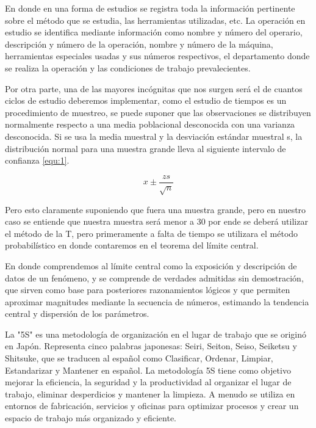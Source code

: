     
    En donde en una forma de estudios se registra toda la información pertinente sobre el método que se estudia, las herramientas utilizadas, etc. La operación en estudio se identifica mediante información como nombre y número del operario, descripción y número de la operación, nombre y número de la máquina, herramientas especiales usadas y sus números respectivos, el departamento donde se realiza la operación y las condiciones de trabajo prevalecientes. 
    \cite{niebel1980ingenieria}
    
    Por otra parte, una de las mayores incógnitas que nos surgen será el de cuantos ciclos de estudio deberemos implementar, como el estudio de tiempos es un procedimiento de muestreo, se puede suponer que las observaciones se distribuyen normalmente respecto a una media poblacional desconocida con una varianza desconocida. Si se usa la media muestral y la desviación estándar muestral s, la distribución normal para una muestra grande lleva al siguiente intervalo de confianza \ref{equ:1}. 
    
    \begin{equation}
        \label{equ:1}
        x {\pm} {\frac{zs}{\sqrt{n}}}
    \end{equation}
    
    Pero esto claramente suponiendo que fuera una muestra grande, pero en nuestro caso se entiende que nuestra muestra será menor a 30 por ende se deberá utilizar el método de la T, pero primeramente a falta de tiempo se utilizara el método probabilístico en donde contaremos en el teorema del límite central.
    
    En donde comprendemos al límite central como la exposición y descripción de datos de un fenómeno, y se comprende de verdades admitidas sin demostración, que sirven como base para posteriores razonamientos lógicos y que permiten aproximar magnitudes mediante la secuencia de números, estimando la tendencia central y dispersión de los parámetros. \cite{RAE}
    
    
    
     La "5S" es una metodología de organización en el lugar de trabajo que se originó en Japón. Representa cinco palabras japonesas: Seiri, Seiton, Seiso, Seiketsu y Shitsuke, que se traducen al español como Clasificar, Ordenar, Limpiar, Estandarizar y Mantener en español. La metodología 5S tiene como objetivo mejorar la eficiencia, la seguridad y la productividad al organizar el lugar de trabajo, eliminar desperdicios y mantener la limpieza. A menudo se utiliza en entornos de fabricación, servicios y oficinas para optimizar procesos y crear un espacio de trabajo más organizado y eficiente.
    
